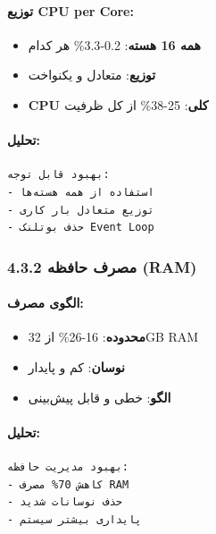 \documentclass[
]{article}
\providecommand{\tightlist}{%
  \setlength{\itemsep}{0pt}\setlength{\parskip}{0pt}}
\begin{document}
\paragraph{توزیع CPU per
Core:}\label{ux62aux648ux632ux6ccux639-cpu-per-core-1}

\begin{itemize}
\tightlist
\item
  \textbf{همه 16 هسته}: 0.2-3.3\% هر کدام
\item
  \textbf{توزیع}: متعادل و یکنواخت
\item
  \textbf{CPU کلی}: 25-38\% از کل ظرفیت
\end{itemize}

\paragraph{تحلیل:}\label{ux62aux62dux644ux6ccux644-2}

\begin{verbatim}
بهبود قابل توجه:
- استفاده از همه هسته‌ها
- توزیع متعادل بار کاری
- حذف بوتلنک Event Loop
\end{verbatim}

\subsubsection{4.3.2 مصرف حافظه
(RAM)}\label{ux645ux635ux631ux641-ux62dux627ux641ux638ux647-ram-1}

\paragraph{الگوی
مصرف:}\label{ux627ux644ux6afux648ux6cc-ux645ux635ux631ux641-1}

\begin{itemize}
\tightlist
\item
  \textbf{محدوده}: 16-26\% از 32GB RAM
\item
  \textbf{نوسان}: کم و پایدار
\item
  \textbf{الگو}: خطی و قابل پیش‌بینی
\end{itemize}

\paragraph{تحلیل:}\label{ux62aux62dux644ux6ccux644-3}

\begin{verbatim}
بهبود مدیریت حافظه:
- کاهش 70% مصرف RAM
- حذف نوسانات شدید
- پایداری بیشتر سیستم
\end{verbatim}
\end{document}
